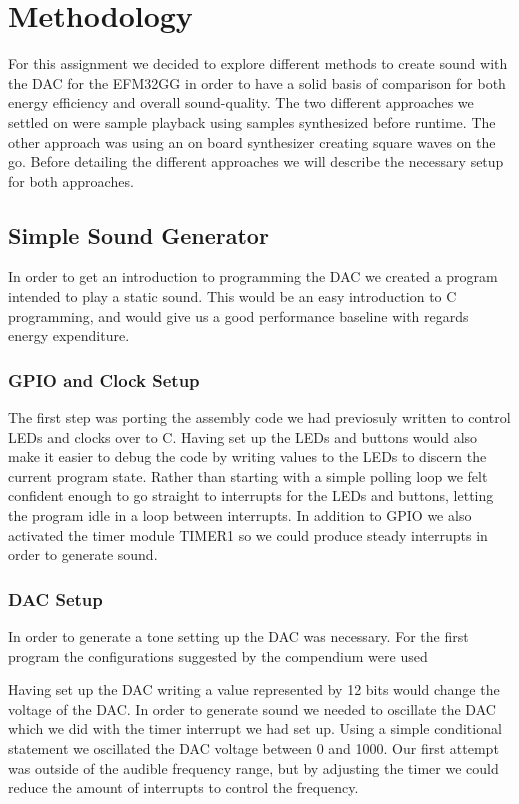 \chapter{Methodology}

For this assignment we decided to explore different methods to create sound with the DAC for the EFM32GG in order to have a solid basis of comparison for both energy efficiency and overall sound-quality. The two different approaches we settled on were sample playback using samples synthesized before runtime. The other approach was using an on board synthesizer creating square waves on the go. Before detailing the different approaches we will describe the necessary setup for both approaches.

\section{Simple Sound Generator}
In order to get an introduction to programming the DAC we created a program intended to play a static sound. This would be an easy introduction to C programming, and would give us a good performance baseline with regards energy expenditure.

\subsection{GPIO and Clock Setup} 
The first step was porting the assembly code we had previosuly written to control LEDs and clocks over to C. Having set up the LEDs and buttons would also make it easier to debug the code by writing values to the LEDs to discern the current program state. Rather than starting with a simple polling loop we felt confident enough to go straight to interrupts for the LEDs and buttons, letting the program idle in a loop between interrupts. In addition to GPIO we also activated the timer module TIMER1 so we could produce steady interrupts in order to generate sound.


\subsection{DAC Setup}
In order to generate a tone setting up the DAC was necessary. For the first program the configurations suggested by the compendium were used


Having set up the DAC writing a value represented by 12 bits would change the voltage of the DAC. In order to generate sound we needed to oscillate the DAC which we did with the timer interrupt we had set up. Using a simple conditional statement we oscillated the DAC voltage between 0 and 1000. Our first attempt was outside of the audible frequency range, but by adjusting the timer we could reduce the amount of interrupts to control the frequency.

